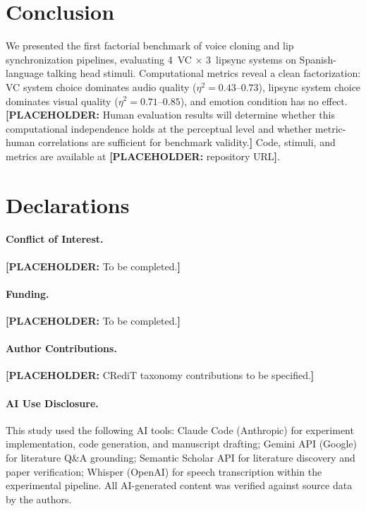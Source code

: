 \documentclass[11pt,a4paper]{article}
\newcommand{\placeholder}[1]{\textcolor{red!70!black}{\textbf{[PLACEHOLDER:} #1\textbf{]}}}
\begin{document}
\section{Conclusion}
\label{sec:conclusion}

We presented the first factorial benchmark of voice cloning and lip synchronization pipelines, evaluating 4~VC $\times$ 3~lipsync systems on Spanish-language talking head stimuli.
Computational metrics reveal a clean factorization: VC system choice dominates audio quality ($\eta^2 = 0.43$--$0.73$), lipsync system choice dominates visual quality ($\eta^2 = 0.71$--$0.85$), and emotion condition has no effect.
\placeholder{Human evaluation results will determine whether this computational independence holds at the perceptual level and whether metric-human correlations are sufficient for benchmark validity.}
Code, stimuli, and metrics are available at \placeholder{repository URL}.

\section*{Declarations}

\paragraph{Conflict of Interest.} \placeholder{To be completed.}

\paragraph{Funding.} \placeholder{To be completed.}

\paragraph{Author Contributions.} \placeholder{CRediT taxonomy contributions to be specified.}

\paragraph{AI Use Disclosure.}
This study used the following AI tools: Claude Code (Anthropic) for experiment implementation, code generation, and manuscript drafting; Gemini API (Google) for literature Q\&A grounding; Semantic Scholar API for literature discovery and paper verification; Whisper (OpenAI) for speech transcription within the experimental pipeline.
All AI-generated content was verified against source data by the authors.



\end{document}

